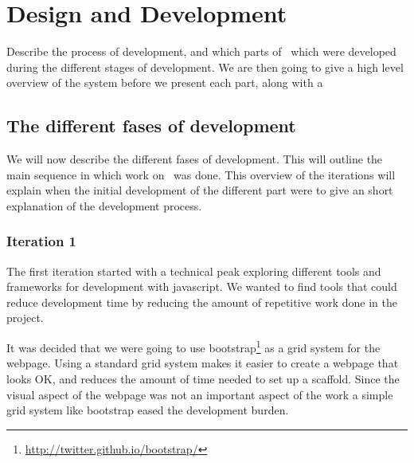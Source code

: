 
\chapter{Design and Development} %

\label{DesignAndDevelopment} %



Describe the process of development,
and which parts of \theartefact\ which were developed during the different stages of development.
We are then going to give a high level overview of the system before we present each part,
along with a

\section{The different fases of development}
We will now describe the different fases of development.
This will outline the main sequence in which work on \theartefact\ was done.
This overview of the iterations will explain when the initial development of
the different part were to give an short explanation of the development process.

\subsection{Iteration 1}
The first iteration started with a technical peak exploring different tools and frameworks for development with javascript.
We wanted to find tools that could reduce development time by reducing the amount of repetitive work done in the project.

It was decided that we were going to use bootstrap\footnote{\url{http://twitter.github.io/bootstrap/}} as a grid system
for the webpage.
Using a standard grid system makes it easier to create a webpage that looks OK,
and reduces the amount of time needed to set up a scaffold.
Since the visual aspect of the webpage was not an important aspect of the work a simple grid system like bootstrap
eased the development burden.

